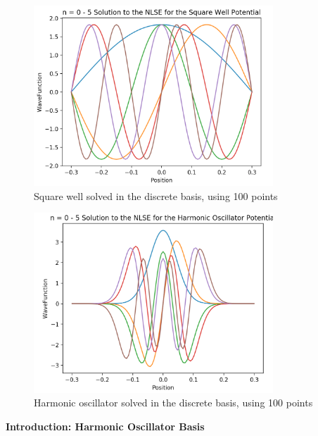 \documentclass[%
 reprint,
 amsmath,amssymb,
 aps,
]{revtex4-1}
\begin{document}
\begin{figure}
\includegraphics[width=9cm]{DiscreteBasisSquareWell}
\caption{Square well solved in the discrete basis, using 100 points}
\end{figure}
\begin{figure}
\includegraphics[width=9cm]{DiscreteBasisHarmonicOscillator}
\caption{Harmonic oscillator solved in the discrete basis, using 100 points}
\end{figure}

\noindent \textbf{Introduction: Harmonic Oscillator Basis}\\
\end{document}
